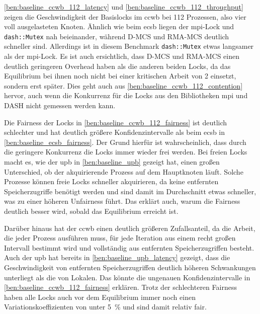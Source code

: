 \autoref{ben:baseline_ccwb_112_latency} und \autoref{ben:baseline_ccwb_112_throughput}
zeigen die Geschwindigkeit der Basislocks im \gls{ccwb} bei 112 Prozessen,
also vier voll ausgelasteten Knoten.
Ähnlich wie beim \gls{ecsb} liegen der \gls{mpi}-Lock und \texttt{dash::Mutex} nah beieinander,
während D-MCS und RMA-MCS deutlich schneller sind.
Allerdings ist in diesem Benchmark \texttt{dash::Mutex} etwas langsamer als der \gls{mpi}-Lock.
Es ist auch ersichtlich,
dass D-MCS und RMA-MCS einen deutlich geringeren Overhead haben
als die anderen beiden Locks,
da das Equilibrium bei ihnen noch nicht bei einer kritischen Arbeit von 2 einsetzt,
sondern erst später.
Dies geht auch aus \autoref{ben:baseline_ccwb_112_contention} hervor,
auch wenn die \gls{Konkurrenz} für die Locks aus den Bibliotheken \gls{mpi} und DASH nicht gemessen werden kann.

Die Fairness der Locks in \autoref{ben:baseline_ccwb_112_fairness} ist deutlich schlechter
und hat deutlich größere Konfidenzintervalle
als beim \gls{ecsb} in \autoref{ben:baseline_ecsb_fairness}.
Der Grund hierfür ist wahrscheinlich,
dass durch die geringere \gls{Konkurrenz} die Locks immer wieder frei werden.
Bei freien Locks macht es,
wie der \gls{upb} in \autoref{ben:baseline_upb} gezeigt hat,
einen großen Unterschied,
ob der akquirierende Prozess auf dem Hauptknoten läuft.
Solche Prozesse können freie Locks schneller akquirieren,
da keine entfernten Speicherzugriffe benötigt werden
und sind damit im Durchschnitt etwas schneller,
was zu einer höheren Unfairness führt.
Das erklärt auch,
warum die Fairness deutlich besser wird,
sobald das Equilibrium erreicht ist.

Darüber hinaus hat der \gls{ccwb} einen deutlich größeren Zufallsanteil,
da die Arbeit,
die jeder Prozess ausführen muss,
für jede Iteration aus einem recht großen Intervall bestimmt wird
und vollständig aus entfernten Speicherzugriffen besteht.
Auch der \gls{upb} hat bereits in \autoref{ben:baseline_upb_latency} gezeigt,
dass die Geschwindigkeit von entfernten Speicherzugriffen deutlich höheren Schwankungen unterliegt
als die von Lokalen.
Das könnte die ungenauen Konfidenzintervalle in \autoref{ben:baseline_ccwb_112_fairness} erklären.
Trotz der schlechteren Fairness haben alle Locks auch vor dem Equilibrium immer noch einen Variationskoeffizienten von unter 5~\%
und sind damit relativ fair.

